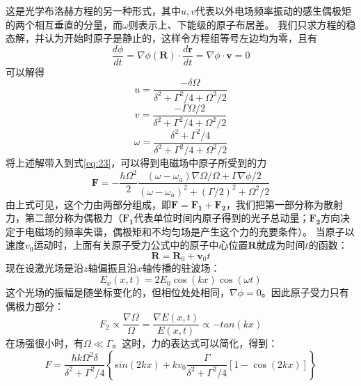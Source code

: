 \documentclass{article}
\begin{document}
	这是光学布洛赫方程的另一种形式，其中$u,v$代表以外电场频率振动的感生偶极矩的两个相互垂直的分量，而$\omega$则表示上、下能级的原子布居差。
	我们只求方程的稳态解，并认为开始时原子是静止的，这样令方程组等号左边均为零，且有
	\begin{equation}
		\frac{d\phi}{dt} = \nabla \phi(\boldsymbol{R}) \cdot \frac{d\boldsymbol{r}}{dt} = \nabla \phi \cdot \boldsymbol{v} = 0
	\end{equation}
	可以解得
	\begin{equation}
		u = \frac{-\delta \Omega}{\delta^2 + \Gamma^2/4 + \Omega^2/2}
	\end{equation}
	\begin{equation}
		v = \frac{-\Gamma \Omega/2}{\delta^2 + \Gamma^2/4 + \Omega^2/2}
	\end{equation}
	\begin{equation}
		\omega = \frac{\delta^2 + \Gamma^2/4}{\delta^2 + \Gamma^2/4 + \Omega^2/2}
	\end{equation}
	将上述解带入到式\ref{eq:23}，可以得到电磁场中原子所受到的力
	\begin{equation}
		\boldsymbol{F} = - \frac{\hbar \Omega^2}{2} \frac{(\omega - \omega_a) \nabla \Omega/\Omega + \Gamma \nabla \phi/2}{(\omega - \omega_a)^2 + (\Gamma/2)^2 + \Omega^2/2}
	\end{equation}
	由上式可见，这个力由两部分组成，即$\boldsymbol{F} = \boldsymbol{F_1} + \boldsymbol{F_2}$，我们把第一部分称为散射力，第二部分称为偶极力（$\boldsymbol{F_1}$代表单位时间内原子得到的光子总动量；$\boldsymbol{F_2}$方向决定于电磁场的频率失谐，偶极矩和不均匀场是产生这个力的充要条件）。
	当原子以速度$v_0$运动时，上面有关原子受力公式中的原子中心位置$\boldsymbol{R}$就成为时间$t$的函数：
	\begin{equation}
		\boldsymbol{R} = \boldsymbol{R}_0 + \boldsymbol{v}_0t
	\end{equation}
	现在设激光场是沿$z$轴偏振且沿$x$轴传播的驻波场：
	\begin{equation}
		E_x(x,t) = 2E_0\cos(kx)\cos(\omega t)
	\end{equation}
	这个光场的振幅是随坐标变化的，但相位处处相同，$\nabla \phi = 0$。因此原子受力只有偶极力部分：
	\begin{equation}
		F_2 \propto \frac{\nabla \Omega}{\Omega} = \frac{\nabla E(x,t)}{E(x,t)} \propto -tan(kx)
	\end{equation}
	在场强很小时，有$\Omega \ll \Gamma$。这时，力的表达式可以简化，得到：
	\begin{equation}
		F = \frac{\hbar k \Omega^2 \delta}{\delta^2 + \Gamma^2/4} \left\{ sin(2kx) + kv_0 \frac{\Gamma}{\delta^2 + \Gamma^2/4}[1-\cos(2kx)] \right\} \label{eq:37}
	\end{equation}
\end{document}
